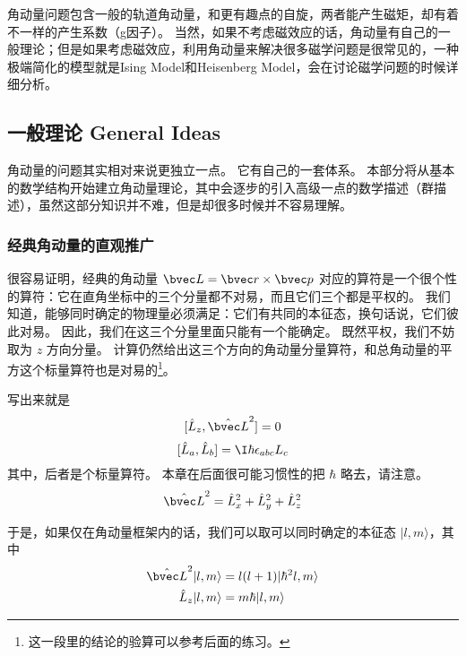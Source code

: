 
角动量问题包含一般的轨道角动量，和更有趣点的自旋，两者能产生磁矩，却有着不一样的产生系数（g因子）。 当然，如果不考虑磁效应的话，角动量有自己的一般理论；但是如果考虑磁效应，利用角动量来解决很多磁学问题是很常见的，一种极端简化的模型就是Ising Model和Heisenberg Model，会在讨论磁学问题的时候详细分析。

\subsection{一般理论 General Ideas}

角动量的问题其实相对来说更独立一点。 它有自己的一套体系。 本部分将从基本的数学结构开始建立角动量理论，其中会逐步的引入高级一点的数学描述（群描述），虽然这部分知识并不难，但是却很多时候并不容易理解。

\subsubsection{经典角动量的直观推广}

很容易证明，经典的角动量 $\bvec L = \bvec r\times \bvec p$ 对应的算符是一个很个性的算符：它在直角坐标中的三个分量都不对易，而且它们三个都是平权的。 我们知道，能够同时确定的物理量必须满足：它们有共同的本征态，换句话说，它们彼此对易。 因此，我们在这三个分量里面只能有一个能确定。 既然平权，我们不妨取为 $z$ 方向分量。 计算仍然给出这三个方向的角动量分量算符，和总角动量的平方这个标量算符也是对易的\footnote{这一段里的结论的验算可以参考后面的练习。}。

写出来就是
\begin{equation}\label{QMAM_eq1}
[\hat L_z, \hat{\bvec L}^2] = 0
\end{equation}
\begin{equation}\label{QMAM_eq2}
[\hat L_a, \hat L_b] = \I\hbar\epsilon_{abc}L_c
\end{equation}
其中，后者是个标量算符。 本章在后面很可能习惯性的把 $\hbar$ 略去，请注意。
\begin{equation}
\hat{\bvec L}^2 = \hat L_x^2+\hat L_y^2+\hat L_z^2
\end{equation}

于是，如果仅在角动量框架内的话，我们可以取可以同时确定的本征态 $|l,m\rangle$，其中
\begin{equation}
\begin{aligned}
\hat{\bvec L}^2|l,m\rangle &= l(l+1)|\hbar^2l,m\rangle\\
\hat L_z|l,m\rangle &= m\hbar|l,m\rangle
\end{aligned}
\end{equation}


